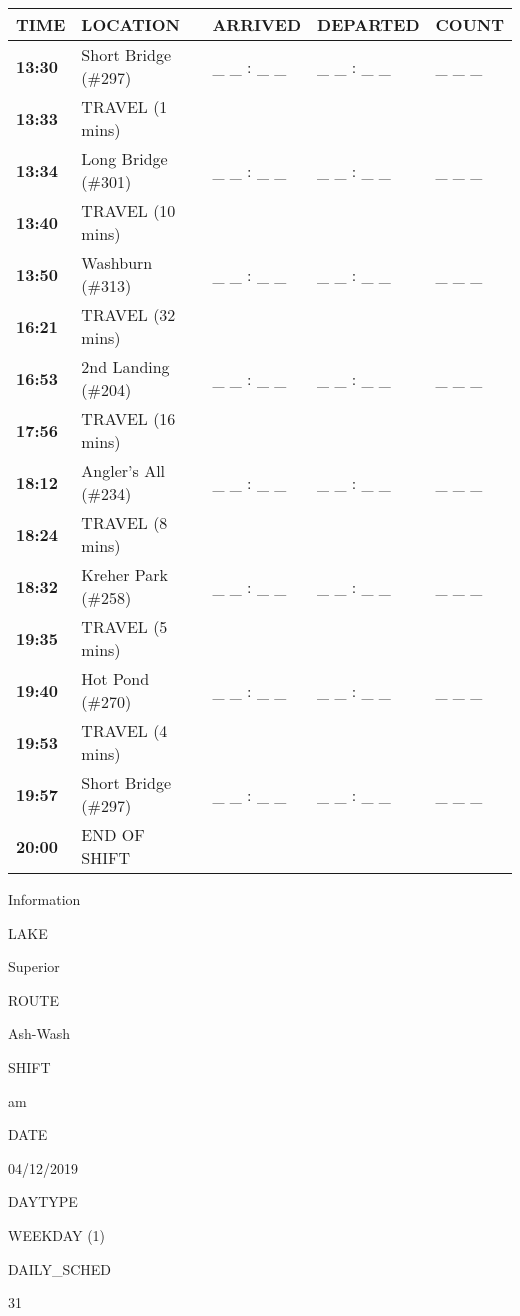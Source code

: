 \documentclass[]{article}
\begin{document}
\begin{tabular}{>{\bfseries}lllll}
\toprule
\textbf{TIME} & \textbf{LOCATION} & \textbf{ARRIVED} & \textbf{DEPARTED} & \textbf{COUNT}\\
\midrule
13:30 & Short Bridge (\#297) & \_ \_ : \_ \_ & \_ \_ : \_ \_ & \_ \_ \_\\
13:33 & TRAVEL (1 mins) &  &  & \\
13:34 & Long Bridge (\#301) & \_ \_ : \_ \_ & \_ \_ : \_ \_ & \_ \_ \_\\
13:40 & TRAVEL (10 mins) &  &  & \\
13:50 & Washburn (\#313) & \_ \_ : \_ \_ & \_ \_ : \_ \_ & \_ \_ \_\\
16:21 & TRAVEL (32 mins) &  &  & \\
16:53 & 2nd Landing (\#204) & \_ \_ : \_ \_ & \_ \_ : \_ \_ & \_ \_ \_\\
17:56 & TRAVEL (16 mins) &  &  & \\
18:12 & Angler's All (\#234) & \_ \_ : \_ \_ & \_ \_ : \_ \_ & \_ \_ \_\\
18:24 & TRAVEL (8 mins) &  &  & \\
18:32 & Kreher Park (\#258) & \_ \_ : \_ \_ & \_ \_ : \_ \_ & \_ \_ \_\\
19:35 & TRAVEL (5 mins) &  &  & \\
19:40 & Hot Pond (\#270) & \_ \_ : \_ \_ & \_ \_ : \_ \_ & \_ \_ \_\\
19:53 & TRAVEL (4 mins) &  &  & \\
19:57 & Short Bridge (\#297) & \_ \_ : \_ \_ & \_ \_ : \_ \_ & \_ \_ \_\\
20:00 & END OF SHIFT &  &  & \\
\bottomrule
\end{tabular}\newpage

Information

LAKE

Superior

ROUTE

Ash-Wash

SHIFT

am

DATE

04/12/2019

DAYTYPE

WEEKDAY (1)

DAILY\_SCHED

31

\vspace{24pt}
\end{document}
